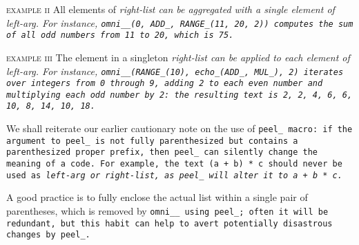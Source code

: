 \textsc{example ii}\indent
All elements of \it{right-list} can be
aggregated with a single element of \it{left-arg}.
For instance, \tt{omni__(0, ADD_, RANGE_(11, 20, 2))}
computes the sum of all odd numbers from 11 to 20, which is 75.

\textsc{example iii}\indent
The element in a singleton \it{right-list} can
be applied to each element of \it{left-arg}.
For instance, \tt{omni__(RANGE_(10), echo_(ADD_, MUL_), 2)} iterates over
integers from 0 through 9, adding 2 to each even number and multiplying each
odd number by 2: the resulting text is \tt{2, 2, 4, 6, 6, 10, 8, 14, 10, 18}.


We shall reiterate our earlier cautionary note on the use of \tt{peel_} macro:
if the argument to \tt{peel_} is not fully
parenthesized but contains a parenthesized proper prefix,
then \tt{peel_} can silently change the meaning of a code.
For example, the text \tt{(a + b) * c} should never be used as \it{left-arg}
or \it{right-list}, as \tt{peel_} will alter it to \tt{a + b * c}.

A good practice is to fully enclose the actual list within a single
pair of parentheses, which is removed by \tt{omni__} using \tt{peel_};
often it will be redundant, but this habit can help
to avert potentially disastrous changes by \tt{peel_}.
